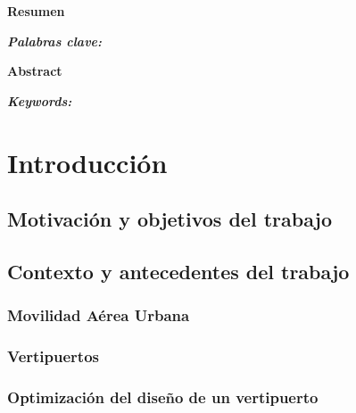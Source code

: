 \documentclass[12pt,a4paper]{book}
\begin{document}
 

\thispagestyle{empty}
\clearpage
\setcounter{page}{1}


\newpage
\begin{center}
   {\bf Resumen} 
\end{center}
   

\vspace{0.6 cm}
\textsl{\textbf{Palabras clave:} } 



\begin{center}
   {\bf Abstract} 
\end{center}



\vspace{0.6 cm}
\textsl{\textbf{Keywords:} } 


\newpage
\tableofcontents

\newpage
\clearpage
{}


\chapter{Introducción} \label{Capitulo 1}
      



\section{Motivación y objetivos del trabajo} \label{Sec:1_1}

   
    
\section{Contexto y antecedentes del trabajo} \label{Sec:1_2}

\subsection{Movilidad Aérea Urbana} \label{Subsubsec: 1_2_1}
  
\subsection{Vertipuertos} \label{Subsec: 1_2_2}

\subsection{Optimización del diseño de un vertipuerto} \label{Subsec: 1_2_3}
\end{document}

